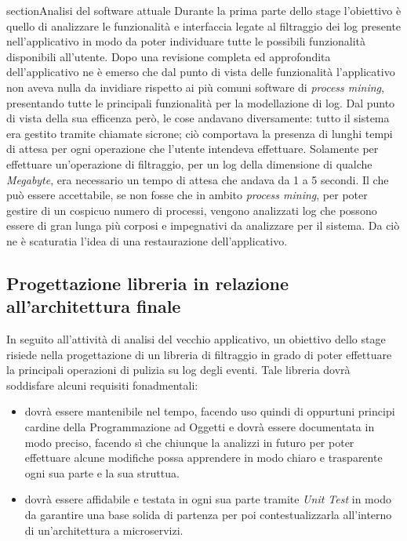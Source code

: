 section{Analisi del software attuale}
Durante la prima parte dello stage l'obiettivo è quello di analizzare le funzionalità e interfaccia legate al filtraggio dei log presente nell'applicativo in modo da poter individuare tutte le possibili funzionalità disponibili all'utente. Dopo una revisione completa ed approfondita dell'applicativo ne è emerso che dal punto di vista delle funzionalità l'applicativo non aveva nulla da invidiare rispetto ai più comuni software di \textit{process mining}, presentando tutte le principali funzionalità per la modellazione di log. Dal punto di vista della sua efficenza però, le cose andavano diversamente: tutto il sistema era gestito tramite chiamate sicrone; ciò comportava la presenza di lunghi tempi di attesa per ogni operazione che l'utente intendeva effettuare. Solamente per effettuare un'operazione di filtraggio, per un log della dimensione di qualche \textit{Megabyte}, era necessario un tempo di attesa che andava da 1 a 5 secondi. Il che può essere accettabile, se non fosse che in ambito \textit{process mining}, per poter gestire di un cospicuo numero di processi, vengono analizzati log che possono essere di gran lunga più corposi e impegnativi da analizzare per il sistema. Da ciò ne è scaturatia l'idea di una restaurazione dell'applicativo.

\subsection{Progettazione libreria in relazione all'architettura finale}
In seguito all'attività di analisi del vecchio applicativo, un obiettivo dello stage risiede nella progettazione di un libreria di filtraggio in grado di poter effettuare la principali operazioni di pulizia su log degli eventi. Tale libreria dovrà soddisfare alcuni requisiti fonadmentali:
\begin{itemize}
	\item dovrà essere mantenibile nel tempo, facendo uso quindi di oppurtuni principi cardine della Programmazione ad Oggetti e dovrà essere documentata in modo preciso, facendo sì che chiunque la analizzi in futuro per poter effettuare alcune modifiche possa apprendere in modo chiaro e trasparente ogni sua parte e la sua struttua.
	\item dovrà essere affidabile e testata in ogni sua parte tramite \textit{Unit Test} in modo da garantire una base solida di partenza per poi contestualizzarla all'interno di un'architettura a microservizi.
\end{itemize}
